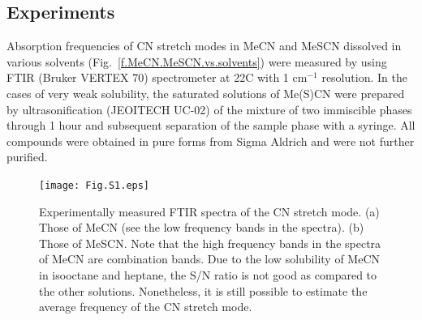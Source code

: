 \documentclass[a4paper,titlepage,twoside,fleqn,12pt]{book}
\begin{document}
\begin{appendices}
\chapter{Experiments\label{a:exp-ftir}}

Absorption frequencies of CN stretch modes in MeCN and MeSCN dissolved in various
solvents (Fig.~\ref{f.MeCN.MeSCN.vs.solvents}) were measured by using FTIR (Bruker VERTEX 70) 
spectrometer at 22{\degree}C with 1 cm$^{-1}$ 
resolution. In the cases of very weak solubility, the saturated solutions of Me(S)CN were 
prepared by ultrasonification (JEOITECH UC-02) of the mixture of two immiscible phases 
through 1 hour and subsequent separation of the sample phase with a syringe. All compounds 
were obtained in pure forms from Sigma Aldrich and were not further purified.
%
\begin{figure}[ht]
\centering
\setlength\fboxsep{0.4pt}
\setlength\fboxrule{0.5pt}
\texttt{[image: Fig.S1.eps]}
\caption{Experimentally measured FTIR spectra of the CN stretch mode. (a) Those of
MeCN (see the low frequency bands in the spectra). (b) Those of MeSCN. Note that the high 
frequency bands in the spectra of MeCN are combination bands. Due to the low solubility of 
MeCN in isooctane and heptane, the S/N ratio is not good as compared to the other solutions. 
Nonetheless, it is still possible to estimate the average frequency of the CN stretch mode.
\label{f.MeCN.MeSCN.vs.solvents.spectra}}
\end{figure}
%



\end{appendices}

%
%
\end{document}
